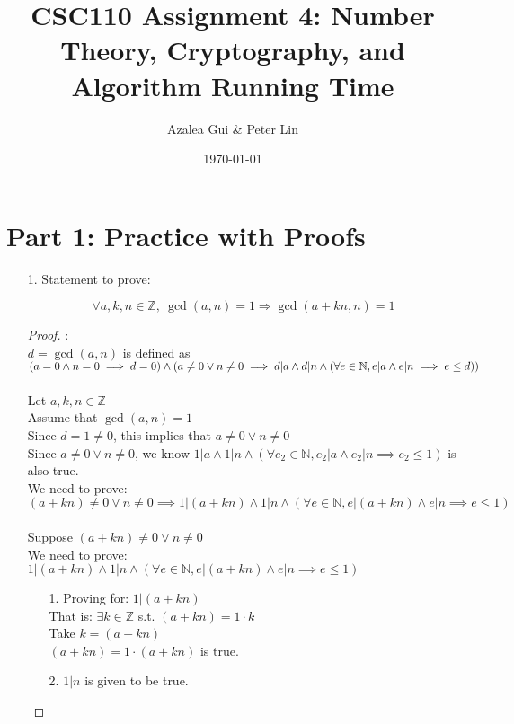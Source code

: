 \documentclass[fontsize=11pt]{article}
\title{CSC110 Assignment 4: Number Theory, Cryptography, and Algorithm Running Time}
\author{Azalea Gui \& Peter Lin}
\date{\today}
\newcommand{\N}{\mathbb{N}}
\newcommand{\Z}{\mathbb{Z}}
\begin{document}
\maketitle

\section*{Part 1: Practice with Proofs}

\begin{enumerate}

\item[1.] Statement to prove:

$$\forall a, k, n \in \Z,~ \gcd(a, n) = 1 \Rightarrow \gcd(a + kn, n) = 1$$

\begin{proof} : \\
$d = \gcd(a,n)$ is defined as $(a=0 \land n=0 \implies d=0) \land \\ (a \neq 0 \lor n \neq 0 \implies d | a \land d | n \land (\forall e \in \N, e | a \land e | n \implies e \le d))$ \\ 
\\
Let $a,k,n \in \Z$ \\
Assume that $\gcd(a,n) = 1$ \\
Since $d = 1 \neq 0$, this implies that $a \neq 0 \lor n \neq 0$ \\
Since $a \neq 0 \lor n \neq 0$, we know $1 | a \land 1 | n \land (\forall e_2 \in \N, e_2 | a \land e_2 | n \implies e_2 \le 1)$ is also true. \\
We need to prove: $(a + kn) \neq 0 \lor n \neq 0 \implies 1 | (a + kn) \land 1 | n \land (\forall e \in \N, e | (a + kn) \land e | n \implies e \le 1)$ \\ 
\\
Suppose $(a + kn) \neq 0 \lor n \neq 0$ \\
We need to prove: $1 | (a + kn) \land 1 | n \land (\forall e \in \N, e | (a + kn) \land e | n \implies e \le 1)$

\begin{enumerate}
    \item[1.] Proving for: $1 | (a + kn)$ \\
        That is: $\exists k \in \Z$ s.t. $(a + kn) = 1 \cdot k$ \\
        Take $k = (a + kn)$ \\
        $(a + kn) = 1 \cdot (a + kn)$ is true.
    
    \item[2.] $1 | n$ is given to be true.
    

\end{enumerate}
\end{proof}
\end{enumerate}
\end{document}
